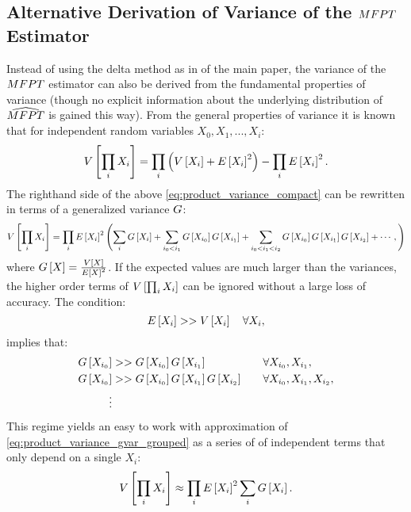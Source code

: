 %
%
%
%

\beginsupplemental

\subsection{Alternative Derivation of Variance of the $MFPT$ Estimator}
\label{sec:sup_alt_var}
Instead of using the delta method as in  of the main paper, the variance of the  $MFPT$ estimator can also be derived from the fundamental properties of variance (though no explicit information about the underlying distribution of $\widehat{MFPT}$ is gained this way). From the general properties of variance it is known that for independent random variables $X_0, X_1, ..., X_i$:
        \begin{equation}
        \label{eq:product_variance_compact}
            V \left[ \prod_i X_i \right] = \prod_i \left(V \left[ X_i \right] + E \left[ X_i \right]^2\right) - \prod_i E \left[ X_i \right]^2.
        \end{equation}
The righthand side of the above \eqref{eq:product_variance_compact} can be rewritten in terms of a generalized variance $G$\cite{Goodman:1962uc}:
        \begin{equation}
        \label{eq:product_variance_gvar_grouped}
            V \left[ \prod_i X_i \right] = \prod_i E \left[ X_i \right]^2 \left( \sum_i G \left[ X_i \right] + \sum_{i_0 < i_1} G \left[ X_{i_0} \right] G \left[ X_{i_1} \right] + \sum_{i_0 < i_1 < i_2} G \left[ X_{i_0} \right] G \left[ X_{i_1} \right] G \left[ X_{i_2} \right] + \cdots, \right)
        \end{equation}
where $G \left[ X \right] = \frac{V \left[ X \right]}{E \left[ X \right]^2}$. If the expected values are much larger than the variances, the higher order terms of $V \left[ \prod_i X_i \right]$ can be ignored without a large loss of accuracy. The condition:
    \begin{equation}
    \label{eq:product_variance_approx_condition}
        E \left[ X_i \right] >> V \left[ X_i \right] \quad \forall X_i,
    \end{equation}
implies that:
    \begin{align*}
        G \left[ X_{i_0} \right] &>> G \left[ X_{i_0} \right]G \left[ X_{i_1} \right] &\quad &\forall X_{i_0}, X_{i_1}, \\
        G \left[ X_{i_0} \right] &>> G \left[ X_{i_0} \right]G \left[ X_{i_1} \right]G \left[ X_{i_2} \right] &\quad &\forall X_{i_0}, X_{i_1}, X_{i_2},\\
        \vdots
    \end{align*}
This regime yields an easy to work with approximation of \eqref{eq:product_variance_gvar_grouped} as a series of of independent terms that only depend on a single $X_i$:
    \begin{equation}
    \label{eq:product_variance_approx}
        V \left[ \prod_i X_i \right] \approx \prod_i E \left[ X_i \right]^2 \sum_i G \left[ X_i \right].
    \end{equation}

